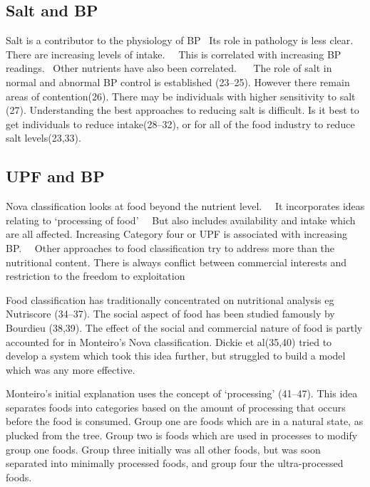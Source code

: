 \documentclass[
]{article}
\begin{document}
\hypertarget{salt-and-bp}{%
\subsection{Salt and BP~}\label{salt-and-bp}}

Salt is a contributor to the physiology of BP~ Its role in pathology is
less clear.~ There are increasing levels of intake.~~ This is correlated
with increasing BP readings.~ Other nutrients have also been
correlated.~ ~ The role of salt in normal and abnormal BP control is
established (23--25). However there remain areas of contention(26).
There may be individuals with higher sensitivity to salt (27).
Understanding the best approaches to reducing salt is difficult. Is it
best to get individuals to reduce intake(28--32), or for all of the food
industry to reduce salt levels(23,33).

\hypertarget{upf-and-bp}{%
\subsection{UPF and BP~}\label{upf-and-bp}}

Nova classification looks at food beyond the nutrient level.~~ It
incorporates ideas relating to `processing of food'~~ But also includes
availability and intake which are all affected. Increasing Category four
or UPF is associated with increasing BP.~ ~Other approaches to food
classification try to address more than the nutritional content. There
is always conflict between commercial interests and restriction to the
freedom to exploitation

Food classification has traditionally concentrated on nutritional
analysis eg Nutriscore (34--37). The social aspect of food has been
studied famously by Bourdieu (38,39). The effect of the social and
commercial nature of food is partly accounted for in Monteiro's Nova
classification. Dickie et al(35,40) tried to develop a system which took
this idea further, but struggled to build a model which was any more
effective.

Monteiro's initial explanation uses the concept of `processing'
(41--47). This idea separates foods into categories based on the amount
of processing that occurs before the food is consumed. Group one are
foods which are in a natural state, as plucked from the tree. Group two
is foods which are used in processes to modify group one foods. Group
three initially was all other foods, but was soon separated into
minimally processed foods, and group four the ultra-processed foods.
\end{document}
